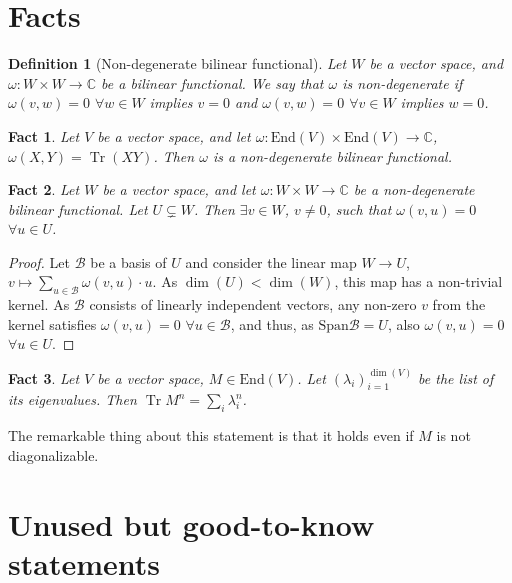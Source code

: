 \documentclass{article}
\newtheorem{fact}{Fact}
\newtheorem{definition}{Definition}
\newcommand{\tr}{\operatorname{Tr}}
\newcommand{\End}{\mathrm{End}}
\newcommand{\Span}{\mathrm{Span}}
\begin{document}
\section{Facts}

\begin{definition}[Non-degenerate bilinear functional]\label{def:nondegen_bili_fcnl}
  Let $W$ be a vector space, and $\omega: W\times W\to \mathbb{C}$ be a bilinear functional.
  We say that $\omega$ is non-degenerate if $\omega(v,w) = 0$ $\forall w\in W$ implies $v=0$ and $\omega(v,w) = 0$ $\forall v\in W$ implies $w=0$.
\end{definition}

\begin{fact}\label{fact:tr_nondegen}
  Let $V$ be a vector space, and let $\omega: \End(V)\times\End(V)\to \mathbb{C}$, $\omega(X,Y)= \tr(XY)$. Then $\omega$ is a non-degenerate bilinear functional.
\end{fact}


\begin{fact}
  Let $W$ be a vector space, and let $\omega: W\times W\to \mathbb{C}$ be a non-degenerate bilinear functional. Let $U\subsetneq W$. Then $\exists v\in W$, $v\neq 0$, such that  $\omega(v,u) =0$ $\forall u\in U$.
\end{fact}

\begin{proof}
   Let $\mathcal{B}$ be a basis of $U$ and consider the linear map $W\to U$, $v \mapsto \sum_{u\in \mathcal{B}} \omega(v,u) \cdot u$. As $\dim(U) < \dim(W)$, this map has a non-trivial kernel. As $\mathcal{B}$ consists of linearly independent vectors, any non-zero $v$ from the kernel satisfies $\omega(v,u) = 0$ $\forall u\in\mathcal{B}$, and thus, as $\Span \mathcal{B} = U$, also $\omega(v,u) = 0$ $\forall u \in U$.    
\end{proof}

\begin{fact}\label{fact:trace_eigen}
  Let $V$ be a vector space, $M\in \End(V)$. Let $(\lambda_i)_{i=1}^{\dim(V)}$ be the list of its eigenvalues. Then $\tr M^n = \sum_i \lambda_i^n$.
\end{fact}

The remarkable thing about this statement is that it holds even if $M$ is not diagonalizable. 


\section{Unused but good-to-know statements}
\end{document}
